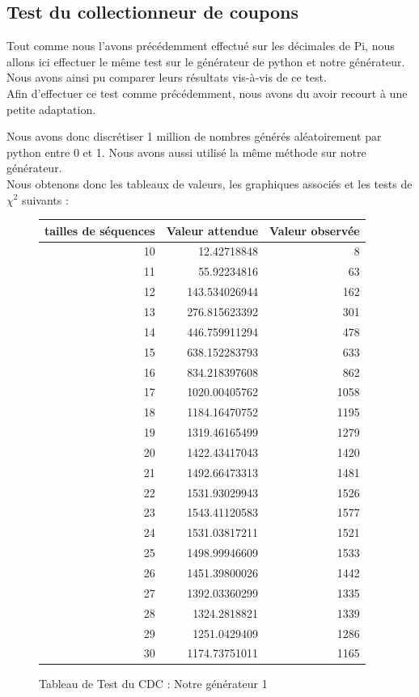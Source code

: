 \documentclass[10pt,a4paper]{article}
\begin{document}
\subsection{Test du collectionneur de coupons}

Tout comme nous l'avons précédemment effectué sur les décimales de Pi, nous allons ici effectuer le même test sur le générateur de python et notre générateur. Nous avons ainsi pu comparer leurs résultats vis-à-vis de ce test.\\

Afin d'effectuer ce test comme précédemment, nous avons du avoir recourt à une petite adaptation. 

Nous avons donc discrétiser 1 million de nombres générés aléatoirement par python entre 0 et 1. Nous avons aussi utilisé la même méthode sur notre générateur. \\

Nous obtenons donc les tableaux de valeurs, les graphiques associés et les tests de $\chi^2$ suivants :

\begin{figure}[h]
\centering
\begin{tabular}{|r|r|r|}
\hline
tailles de séquences & Valeur attendue & Valeur observée\\
\hline
10 & 12.42718848 & 8\\
11 & 55.92234816 & 63\\
12 & 143.534026944 & 162\\
13 & 276.815623392 & 301\\
14 & 446.759911294 & 478\\
15 & 638.152283793 & 633\\
16 & 834.218397608 & 862\\
17 & 1020.00405762 & 1058\\
18 & 1184.16470752 & 1195\\
19 & 1319.46165499 & 1279\\
20 & 1422.43417043 & 1420\\
21 & 1492.66473313 & 1481\\
22 & 1531.93029943 & 1526\\
23 & 1543.41120583 & 1577\\
24 & 1531.03817211 & 1521\\
25 & 1498.99946609 & 1533\\
26 & 1451.39800026 & 1442\\
27 & 1392.03360299 & 1335\\
28 & 1324.2818821 & 1339\\
29 & 1251.0429409 & 1286\\
30 & 1174.73751011 & 1165\\
\hline
\end{tabular}
\caption{Tableau de Test du CDC : Notre générateur 1}
\end{figure}
\end{document}

